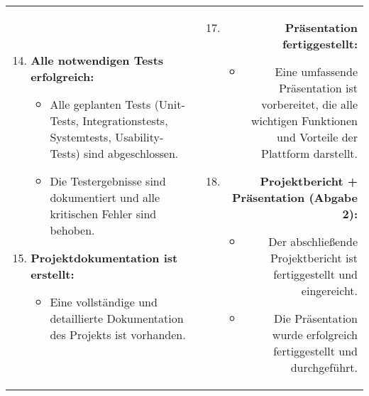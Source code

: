     \vspace{0.5cm}
    \begin{tabularx}{\textwidth}{L R}
        \begin{enumerate}[left=0pt,label=\arabic*.]
            \setcounter{enumi}{13}
            \small

            \item \textbf{Alle notwendigen Tests erfolgreich:}
            \begin{itemize}[label=--]
                \item Alle geplanten Tests (Unit-Tests, Integrationstests, Systemtests, Usability-Tests) sind abgeschlossen.
                \item Die Testergebnisse sind dokumentiert und alle kritischen Fehler sind behoben.
            \end{itemize}

            \item \textbf{Projektdokumentation ist erstellt:}
            \begin{itemize}[label=--]
                \item Eine vollständige und detaillierte Dokumentation des Projekts ist vorhanden.
            \end{itemize}

        \end{enumerate}
        &
        \begin{enumerate}[left=0pt,label=\arabic*.]
            \setcounter{enumi}{16}
            \small
            \item \textbf{Präsentation fertiggestellt:}
            \begin{itemize}[label=--]
                \item Eine umfassende Präsentation ist vorbereitet, die alle wichtigen Funktionen und Vorteile der Plattform darstellt.
            \end{itemize}

            \item \textbf{Projektbericht + Präsentation (Abgabe 2):}
            \begin{itemize}[label=--]
                \item Der abschließende Projektbericht ist fertiggestellt und eingereicht.
                \item Die Präsentation wurde erfolgreich fertiggestellt und durchgeführt.
            \end{itemize}
        \end{enumerate}
    \end{tabularx}

